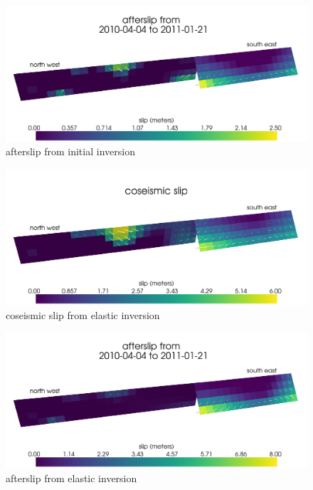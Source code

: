 \documentclass[12pt]{article}
\begin{document}
\begin{figure}
\includegraphics[scale=0.1]{Figures/initial_afterslip}
\centering 
\caption{afterslip from initial inversion}
\label{fig:InitialAfterslip}
\end{figure} 

\begin{figure}
\includegraphics[scale=0.1]{Figures/initial_elastic_coseismic}
\centering 
\caption{coseismic slip from elastic inversion}
\label{fig:InitialElasticCoseismic}
\end{figure} 

\begin{figure}
\includegraphics[scale=0.1]{Figures/initial_elastic_afterslip}
\centering 
\caption{afterslip from elastic inversion}
\label{fig:InitialElasticAfterslip}
\end{figure} 
\end{document}
